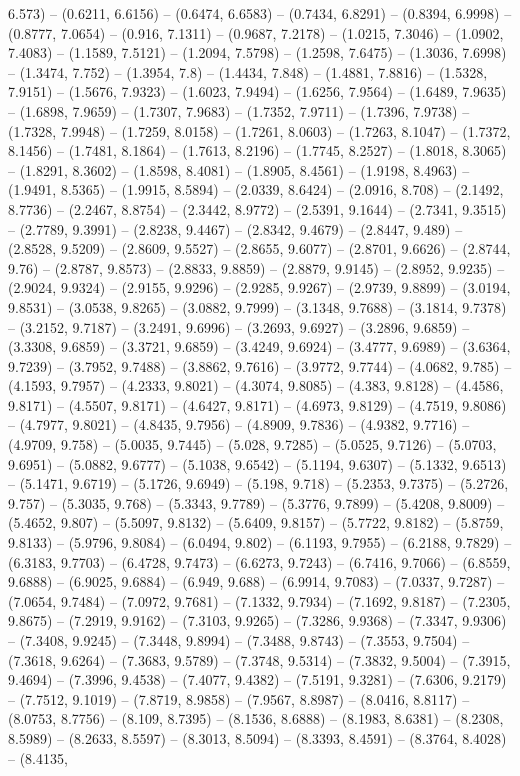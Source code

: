 6.573) -- (0.6211, 6.6156) -- (0.6474, 6.6583) -- (0.7434, 6.8291) -- (0.8394, 6.9998) -- (0.8777, 7.0654) -- (0.916, 7.1311) -- (0.9687, 7.2178) -- (1.0215, 7.3046) -- (1.0902, 7.4083) -- (1.1589, 7.5121) -- (1.2094, 7.5798) -- (1.2598, 7.6475) -- (1.3036, 7.6998) -- (1.3474, 7.752) -- (1.3954, 7.8) -- (1.4434, 7.848) -- (1.4881, 7.8816) -- (1.5328, 7.9151) -- (1.5676, 7.9323) -- (1.6023, 7.9494) -- (1.6256, 7.9564) -- (1.6489, 7.9635) -- (1.6898, 7.9659) -- (1.7307, 7.9683) -- (1.7352, 7.9711) -- (1.7396, 7.9738) -- (1.7328, 7.9948) -- (1.7259, 8.0158) -- (1.7261, 8.0603) -- (1.7263, 8.1047) -- (1.7372, 8.1456) -- (1.7481, 8.1864) -- (1.7613, 8.2196) -- (1.7745, 8.2527) -- (1.8018, 8.3065) -- (1.8291, 8.3602) -- (1.8598, 8.4081) -- (1.8905, 8.4561) -- (1.9198, 8.4963) -- (1.9491, 8.5365) -- (1.9915, 8.5894) -- (2.0339, 8.6424) -- (2.0916, 8.708) -- (2.1492, 8.7736) -- (2.2467, 8.8754) -- (2.3442, 8.9772) -- (2.5391, 9.1644) -- (2.7341, 9.3515) -- (2.7789, 9.3991) -- (2.8238, 9.4467) -- (2.8342, 9.4679) -- (2.8447, 9.489) -- (2.8528, 9.5209) -- (2.8609, 9.5527) -- (2.8655, 9.6077) -- (2.8701, 9.6626) -- (2.8744, 9.76) -- (2.8787, 9.8573) -- (2.8833, 9.8859) -- (2.8879, 9.9145) -- (2.8952, 9.9235) -- (2.9024, 9.9324) -- (2.9155, 9.9296) -- (2.9285, 9.9267) -- (2.9739, 9.8899) -- (3.0194, 9.8531) -- (3.0538, 9.8265) -- (3.0882, 9.7999) -- (3.1348, 9.7688) -- (3.1814, 9.7378) -- (3.2152, 9.7187) -- (3.2491, 9.6996) -- (3.2693, 9.6927) -- (3.2896, 9.6859) -- (3.3308, 9.6859) -- (3.3721, 9.6859) -- (3.4249, 9.6924) -- (3.4777, 9.6989) -- (3.6364, 9.7239) -- (3.7952, 9.7488) -- (3.8862, 9.7616) -- (3.9772, 9.7744) -- (4.0682, 9.785) -- (4.1593, 9.7957) -- (4.2333, 9.8021) -- (4.3074, 9.8085) -- (4.383, 9.8128) -- (4.4586, 9.8171) -- (4.5507, 9.8171) -- (4.6427, 9.8171) -- (4.6973, 9.8129) -- (4.7519, 9.8086) -- (4.7977, 9.8021) -- (4.8435, 9.7956) -- (4.8909, 9.7836) -- (4.9382, 9.7716) -- (4.9709, 9.758) -- (5.0035, 9.7445) -- (5.028, 9.7285) -- (5.0525, 9.7126) -- (5.0703, 9.6951) -- (5.0882, 9.6777) -- (5.1038, 9.6542) -- (5.1194, 9.6307) -- (5.1332, 9.6513) -- (5.1471, 9.6719) -- (5.1726, 9.6949) -- (5.198, 9.718) -- (5.2353, 9.7375) -- (5.2726, 9.757) -- (5.3035, 9.768) -- (5.3343, 9.7789) -- (5.3776, 9.7899) -- (5.4208, 9.8009) -- (5.4652, 9.807) -- (5.5097, 9.8132) -- (5.6409, 9.8157) -- (5.7722, 9.8182) -- (5.8759, 9.8133) -- (5.9796, 9.8084) -- (6.0494, 9.802) -- (6.1193, 9.7955) -- (6.2188, 9.7829) -- (6.3183, 9.7703) -- (6.4728, 9.7473) -- (6.6273, 9.7243) -- (6.7416, 9.7066) -- (6.8559, 9.6888) -- (6.9025, 9.6884) -- (6.949, 9.688) -- (6.9914, 9.7083) -- (7.0337, 9.7287) -- (7.0654, 9.7484) -- (7.0972, 9.7681) -- (7.1332, 9.7934) -- (7.1692, 9.8187) -- (7.2305, 9.8675) -- (7.2919, 9.9162) -- (7.3103, 9.9265) -- (7.3286, 9.9368) -- (7.3347, 9.9306) -- (7.3408, 9.9245) -- (7.3448, 9.8994) -- (7.3488, 9.8743) -- (7.3553, 9.7504) -- (7.3618, 9.6264) -- (7.3683, 9.5789) -- (7.3748, 9.5314) -- (7.3832, 9.5004) -- (7.3915, 9.4694) -- (7.3996, 9.4538) -- (7.4077, 9.4382) -- (7.5191, 9.3281) -- (7.6306, 9.2179) -- (7.7512, 9.1019) -- (7.8719, 8.9858) -- (7.9567, 8.8987) -- (8.0416, 8.8117) -- (8.0753, 8.7756) -- (8.109, 8.7395) -- (8.1536, 8.6888) -- (8.1983, 8.6381) -- (8.2308, 8.5989) -- (8.2633, 8.5597) -- (8.3013, 8.5094) -- (8.3393, 8.4591) -- (8.3764, 8.4028) -- (8.4135, 